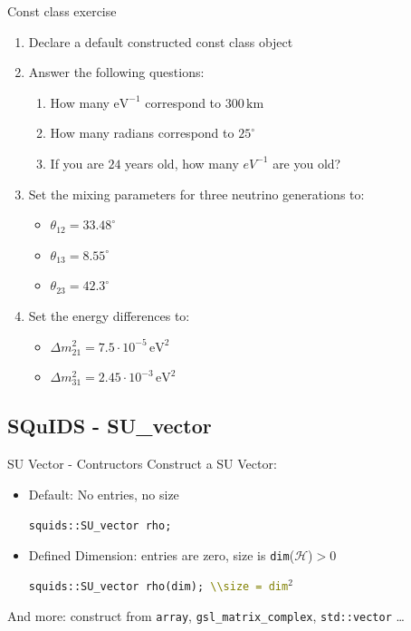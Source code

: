 \documentclass[]{beamer}
\begin{document}
\begin{frame}{Const class exercise}
  \begin{enumerate}
    \item Declare a default constructed const class object
    \item Answer the following questions:
    \begin{enumerate}
      \item How many \(\mathrm{eV}^{-1}\) correspond to \(300\,\mathrm{km}\)
      \item How many radians correspond to \(25^\circ\)
      \item If you are \(24\) years old, how many \(eV^{-1}\) are you old?
    \end{enumerate}
    \item Set the mixing parameters for three neutrino generations to:
    \begin{itemize}
      \item \(\theta_{12} = 33.48^\circ\)
      \item \(\theta_{13} = 8.55^\circ\)
      \item \(\theta_{23} = 42.3^\circ\)
    \end{itemize}
    \item Set the energy differences to:
    \begin{itemize}
      \item \(\Delta m^2_{21} = 7.5 \cdot 10^{-5} \, \mathrm{eV}^2\)
      \item \(\Delta m^2_{31} = 2.45 \cdot 10^{-3} \, \mathrm{eV}^2\)
    \end{itemize}
  \end{enumerate}
\end{frame}

\subsection{SQuIDS - SU\_vector}

\begin{frame}
\end{frame}

\begin{frame}{SU Vector - Contructors}
  Construct a SU Vector:
  \begin{itemize}
    \item Default: No entries, no size
    \begin{tcolorbox}[colback=gray!5!white]
      \texttt{squids::SU\_vector rho;}
    \end{tcolorbox}
    \item Defined Dimension: entries are zero, size is \texttt{dim}(\(\mathcal{H}\))\(> 0\)
    \begin{tcolorbox}[colback=gray!5!white]
      \texttt{squids::SU\_vector rho(dim); \textcolor{olive}{\textbackslash \textbackslash size = dim}\(^2\)}
    \end{tcolorbox}
  \end{itemize}
  And more: construct from \texttt{array}, \texttt{gsl\_matrix\_complex}, \texttt{std::vector} \ldots
\end{frame}
\end{document}
